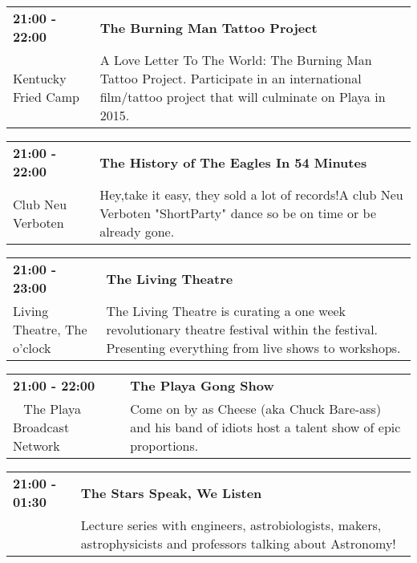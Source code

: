 \begin{tabular}{ p{1in} p{2.2in} }
    \textbf{21:00 - 22:00} & \textbf{The Burning Man Tattoo Project} \\
    Kentucky Fried Camp \newline  & A Love Letter To The World: The Burning Man Tattoo Project. Participate in an international film/tattoo project that will culminate on Playa in 2015. \\
    \hline 
\end{tabular}
    
\begin{tabular}{ p{1in} p{2.2in} }
    \textbf{21:00 - 22:00} & \textbf{ The History of The Eagles In 54 Minutes} \\
    Club Neu Verboten \newline  & Hey,take it easy, they sold a lot of records!A club Neu Verboten "ShortParty" dance so be on time or be already gone. \\
    \hline 
\end{tabular}
    
\begin{tabular}{ p{1in} p{2.2in} }
    \textbf{21:00 - 23:00} & \textbf{The Living Theatre} \\
    Living Theatre, The \newline 6 o'clock & The Living Theatre is curating a one week revolutionary theatre festival within the festival. Presenting everything from live shows to workshops. \\
    \hline 
\end{tabular}
    
\begin{tabular}{ p{1in} p{2.2in} }
    \textbf{21:00 - 22:00} & \textbf{The Playa Gong Show} \\
    ~ \newline The Playa Broadcast Network & Come on by as Cheese (aka Chuck Bare-ass) and his band of idiots host a talent show of epic proportions. \\
    \hline 
\end{tabular}
    
\begin{tabular}{ p{1in} p{2.2in} }
    \textbf{21:00 - 01:30} & \textbf{The Stars Speak, We Listen} \\
    ~ \newline  & Lecture series with engineers, astrobiologists, makers, astrophysicists and professors talking about Astronomy! \\
    \hline 
\end{tabular}
    
